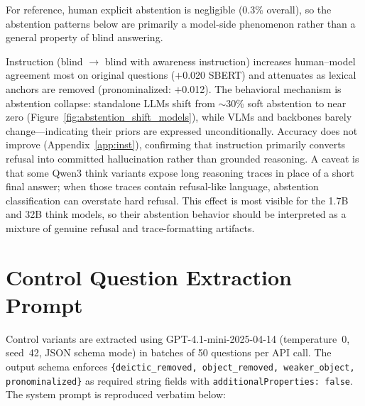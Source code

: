 \documentclass[letterpaper]{article}
\begin{document}
For reference, human explicit abstention is negligible (0.3\% overall), so
the abstention patterns below are primarily a model-side phenomenon rather
than a general property of blind answering.

Instruction (blind $\to$ blind with awareness instruction) increases human--model agreement most on
original questions ($+$0.020 SBERT) and attenuates as lexical anchors are
removed (pronominalized: $+$0.012). The behavioral mechanism is abstention
collapse: standalone LLMs shift from $\sim$30\% soft abstention to near
zero (Figure~\ref{fig:abstention_shift_models}), while VLMs and backbones barely
change---indicating their priors are expressed unconditionally. Accuracy
does not improve (Appendix~\ref{app:inst}), confirming that instruction
primarily converts refusal into committed hallucination rather than grounded
reasoning. A caveat is that some Qwen3 think variants expose long reasoning
traces in place of a short final answer; when those traces contain refusal-like
language, abstention classification can overstate hard refusal. This effect is
most visible for the 1.7B and 32B think models, so their abstention behavior
should be interpreted as a mixture of genuine refusal and trace-formatting
artifacts.

\section{Control Question Extraction Prompt}
\label{app:ctl}

Control variants are extracted using GPT-4.1-mini-2025-04-14 (temperature~0,
seed~42, JSON schema mode) in batches of 50 questions per API call.
The output schema enforces
\texttt{\{deictic\_removed, object\_removed, weaker\_object, pronominalized\}}
as required string fields with \texttt{additionalProperties:~false}.
The system prompt is reproduced verbatim below:
\end{document}

